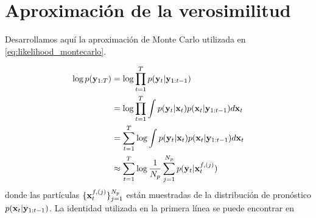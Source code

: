 \section{Aproximación de la verosimilitud}\label{appendix:likelihood_montecarlo}

Desarrollamos aquí la aproximación de Monte Carlo utilizada en \ref{eq:likelihood_montecarlo}.

\begin{align*}
    \log p(\mathbf{y}_{1:T}) &= \log \prod_{t=1}^{T} p(\mathbf{y}_t | \mathbf{y}_{1:t-1}) \\
    &= \log \prod_{t=1}^{T} \int p(\mathbf{y}_t | \mathbf{x}_t) p(\mathbf{x}_t | \mathbf{y}_{1:t-1}) d\mathbf{x}_t \\
    &= \sum_{t=1}^{T} \log \int p(\mathbf{y}_t | \mathbf{x}_t) p(\mathbf{x}_t | \mathbf{y}_{1:t-1}) d\mathbf{x}_t \\
    &\approx \sum_{t=1}^{T} \log \frac{1}{N_p} \sum_{j=1}^{N_p} p(\mathbf{y}_t | \mathbf{x}_t^{f, (j)})
\end{align*}
donde las partículas $\{\mathbf{x}_t^{f, (j)}\}_{j=1}^{N_p}$ están muestradas de la distribución de pronóstico $p(\mathbf{x}_t | \mathbf{y}_{1:t-1})$. La identidad utilizada en la primera línea se puede encontrar en \cite{Carrassi2017}
